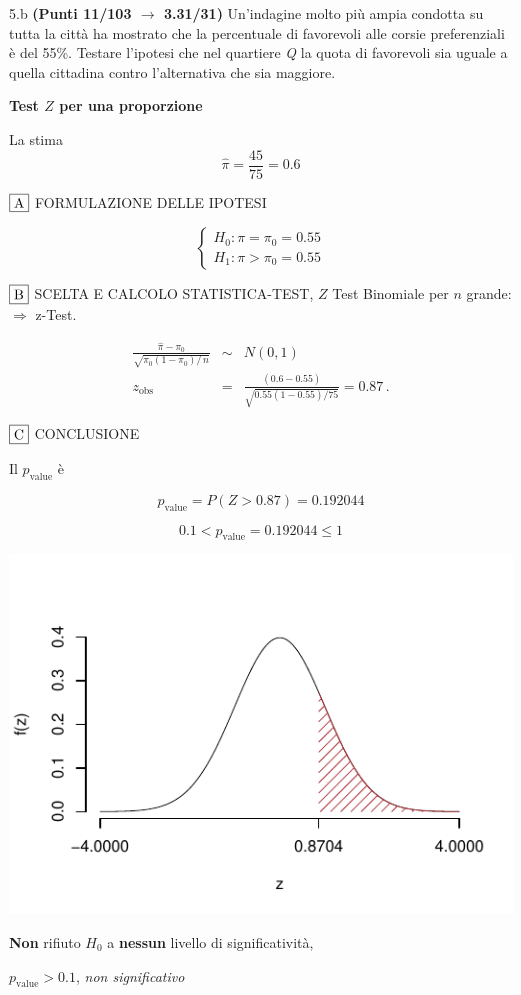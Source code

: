 \documentclass[
  11pt,
]{book}
\theoremstyle{mytheoremstyle}
\theoremstyle{mydefstyle}
\newenvironment{sol}
  {
  \begin{tcolorbox}[enhanced,breakable,arc=0.1mm,boxrule=1pt,colback=white,colframe=iblue,
  title=\bf \fontfamily{lmss}\selectfont \hspace{.5 cm} Soluzione,drop fuzzy shadow]

}{
\end{tcolorbox}
  }
\begin{document}
5.b \textbf{(Punti 11/103 \(\rightarrow\) 3.31/31)} Un'indagine molto più ampia condotta su tutta la città ha mostrato che
la percentuale di favorevoli alle corsie preferenziali è del 55\%. Testare l'ipotesi che nel quartiere \emph{Q} la quota di favorevoli sia uguale a quella cittadina contro l'alternativa che sia maggiore.

\begin{sol}
\textbf{Test \(Z\) per una proporzione}

La stima
\[\hat\pi=\frac { 45 } { 75 }= 0.6  \]

\(\fbox{A}\) FORMULAZIONE DELLE IPOTESI

\[\begin{cases}
   H_0: \pi = \pi_0=0.55 \\
   H_1: \pi > \pi_0=0.55 
   \end{cases}\]

\(\fbox{B}\) SCELTA E CALCOLO STATISTICA-TEST, \(Z\)
Test Binomiale per \(n\) grande: \(\Rightarrow\) z-Test.

\begin{eqnarray*}
   \frac{\hat\pi - \pi_{0}} {\sqrt {\pi_0(1-\pi_0)/\,n}}&\sim&N(0,1)\\
   z_{\text{obs}}
   &=& \frac{ ( 0.6 -  0.55 )} {\sqrt{ 0.55 (1- 0.55 )/ 75 }}
   =   0.87 \,.
   \end{eqnarray*}

\(\fbox{C}\) CONCLUSIONE

Il \(p_{\text{value}}\) è

\[ p_{\text{value}} = P(Z>0.87)=0.192044 \]

\[
 0.1 < p_\text{value}= 0.192044 \leq 1 
\]

\begin{center}\includegraphics{Esami_passati_con_soluzioni_files/figure-latex/2022-61-1} \end{center}

\textbf{Non} rifiuto \(H_0\) a \textbf{nessun}
livello di significatività,

\(p_\text{value}>0.1\),
\emph{non significativo}

\end{sol}
\end{document}
